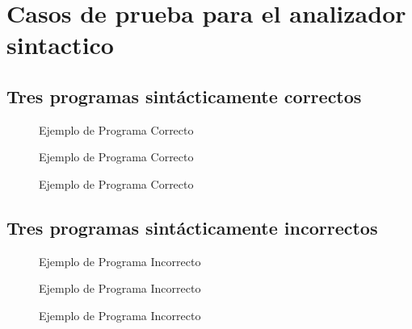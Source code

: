 \section{Casos de prueba para el analizador sintactico}
\label{sec:syntaxTest}

\subsection{Tres programas sintácticamente correctos}
\label{subsec: syntaxCorr}
\begin{figure}[H]
    \caption{Ejemplo de Programa Correcto}
    \label{fig: corr1}
\end{figure}

\begin{figure}[H]
    \caption{Ejemplo de Programa Correcto}
    \label{fig: corr2}
\end{figure}

\begin{figure}[ht]
    \caption{Ejemplo de Programa Correcto}
    \label{fig: corr3}
\end{figure}

\subsection{Tres programas sintácticamente incorrectos}

\label{subsec: syntaxIncorr}
\begin{figure}[H]
    \caption{Ejemplo de Programa Incorrecto}
    \label{fig: incorr1}
\end{figure}

\begin{figure}[H]
    \caption{Ejemplo de Programa Incorrecto}
    \label{fig: incorr2}
\end{figure}

\begin{figure}[H]
    \caption{Ejemplo de Programa Incorrecto}
    \label{fig: incorr3}
\end{figure}